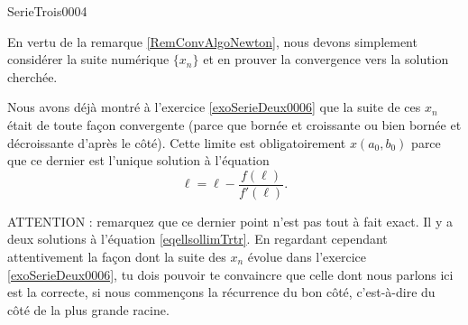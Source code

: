 
\begin{corrige}{SerieTrois0004}

	En vertu de la remarque \ref{RemConvAlgoNewton}, nous devons simplement considérer la suite numérique $\{ x_n\}$ et en prouver la convergence vers la solution cherchée.

	Nous avons déjà montré à l'exercice \ref{exoSerieDeux0006} que la suite de ces $x_n$ était de toute façon convergente (parce que bornée et croissante ou bien bornée et décroissante d'après le côté). Cette limite est obligatoirement $x(a_0,b_0)$ parce que ce dernier est l'unique solution à l'équation
	\begin{equation}		\label{eqellsollimTrtr}
		\ell=\ell-\frac{ f(\ell) }{ f'(\ell) }.
	\end{equation}
	
	ATTENTION : remarquez que ce dernier point n'est pas tout à fait exact. Il y a deux solutions à l'équation \eqref{eqellsollimTrtr}. En regardant cependant attentivement la façon dont la suite des $x_n$ évolue dans l'exercice \ref{exoSerieDeux0006}, tu dois pouvoir te convaincre que celle dont nous parlons ici est la correcte, si nous commençons la récurrence du bon côté, c'est-à-dire du côté de la plus grande racine.

\end{corrige}
